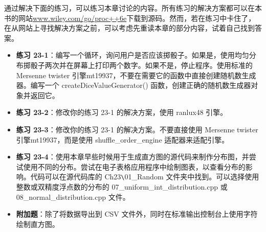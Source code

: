 通过解决下面的练习，可以练习本章讨论的内容。所有练习的解决方案都可以在本书的网站\url{www.wiley.com/go/proc++6e}下载到源码。然而，若在练习中卡住了，在从网站上寻找解决方案之前，可以考虑先重读本章的部分内容，试着自己找到答案。

\begin{itemize}
\item
\textbf{练习 23-1}：编写一个循环，询问用户是否应该掷骰子。如果是，使用均匀分布掷骰子两次并在屏幕上打印两个数字。如果不是，停止程序。使用标准的  Mersenne twister 引擎mt19937，不要在需要它的函数中直接创建随机数生成器。编写一个 createDiceValueGenerator() 函数，创建正确的随机数生成器对象并返回它。

\item
\textbf{练习 23-2}：修改你的练习 23-1 的解决方案，使用 ranlux48 引擎。

\item
\textbf{练习 23-3}：修改你的练习 23-1 的解决方案。不要直接使用  Mersenne twister 引擎mt19937，而是使用 shuffle\_order\_engine 适配器来适配引擎。

\item
\textbf{练习 23-4}：使用本章早些时候用于生成直方图的源代码来制作分布图，并尝试使用不同的分布。尝试在电子表格应用程序中绘制图表，以查看分布的影响。代码可以在源代码库的 Ch23\verb|\|01\_Random 文件夹中找到。可以选择使用整数或双精度浮点数的分布的 07\_uniform\_int\_distribution.cpp 或 08\_normal\_distribution.cpp 文件。

\item
\textbf{附加题}：除了将数据导出到 CSV 文件外，同时在标准输出控制台上使用字符绘制直方图。
\end{itemize}













